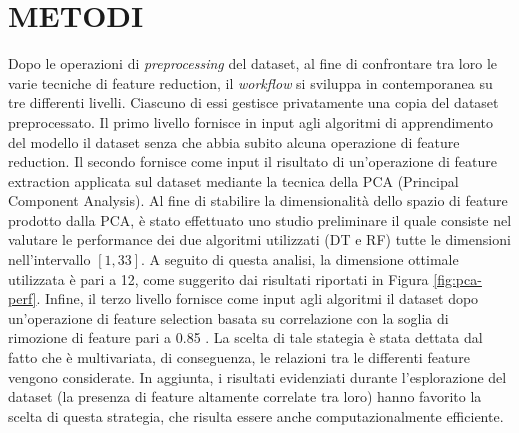 \section{METODI}
Dopo le operazioni di \textit{preprocessing} del dataset, al fine di confrontare tra loro le varie tecniche di feature reduction, il \textit{workflow} si sviluppa in contemporanea su tre differenti livelli.
Ciascuno di essi gestisce privatamente una copia del dataset preprocessato.
Il primo livello fornisce in input agli algoritmi di apprendimento del modello il dataset senza che abbia subito alcuna operazione di feature reduction.
Il secondo fornisce come input il risultato di un'operazione di feature extraction applicata sul dataset mediante la tecnica della PCA (Principal Component Analysis).
Al fine di stabilire la dimensionalità dello spazio di feature prodotto dalla PCA, è stato effettuato uno studio preliminare il quale consiste nel valutare le performance dei due algoritmi utilizzati (DT e RF)  tutte le dimensioni nell'intervallo $[1, 33]$.
A seguito di questa analisi, la dimensione ottimale utilizzata è pari a 12, come suggerito dai risultati riportati in Figura \ref{fig:pca-perf}.
Infine, il terzo livello fornisce come input agli algoritmi il dataset dopo un'operazione di feature selection basata su correlazione  con la soglia di rimozione di feature pari a 0.85 .
La scelta di tale stategia è stata dettata dal fatto che è multivariata, di conseguenza, le relazioni tra le differenti feature vengono considerate. 
In aggiunta, i risultati evidenziati durante l'esplorazione del dataset (la presenza di feature altamente correlate tra loro) hanno favorito la scelta di questa strategia, che risulta essere anche computazionalmente efficiente.

